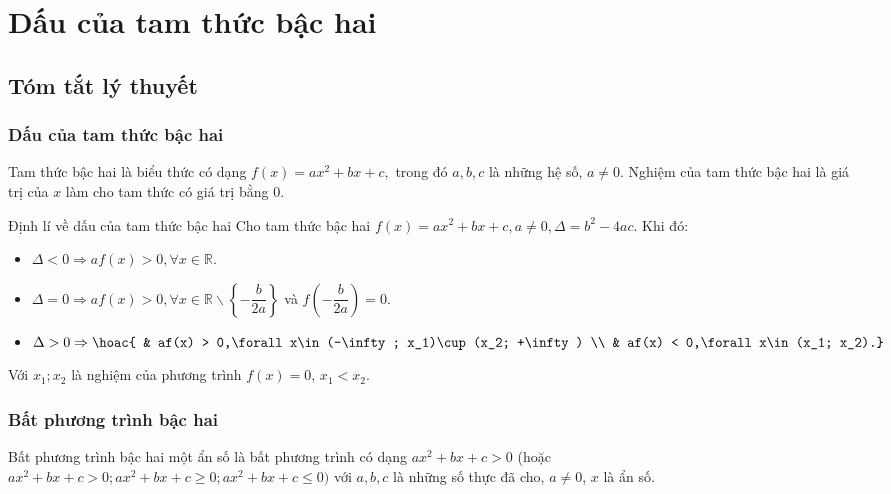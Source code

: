 \setcounter{dang}{0}
\section{Dấu của tam thức bậc hai}
\subsection{Tóm tắt lý thuyết}
	\subsubsection{Dấu của tam thức bậc hai}
	\begin{dn}{}
	Tam thức bậc hai là biểu thức có dạng $f(x) = ax^2 + bx + c,$ trong đó $a,b,c$ là những hệ số, $a\ne 0$. Nghiệm của tam thức bậc hai là giá trị của $x$ làm cho tam thức có giá trị bằng $0$.
	\end{dn}
	\begin{dl}{Định lí về dấu của tam thức bậc hai}
	Cho tam thức bậc hai $f(x) = ax^2 + bx + c,a\ne 0,\Delta = b^2 - 4ac$.
	Khi đó:
	\begin{itemize}
	\item $\Delta < 0\Rightarrow af(x) > 0,\forall x\in \mathbb{R}$.
	\item $ \Delta = 0\Rightarrow af(x) > 0,\forall x\in \mathbb{R}\backslash \left\{ - \dfrac{b}{2a}\right\} $ và $f\left(-\dfrac{b}{2a}\right)=0$.
	\item $ \Delta > 0\Rightarrow \hoac{
	& af(x) > 0,\forall x\in (-\infty; x_1)\cup (x_2; +\infty) \\ 
	& af(x) < 0,\forall x\in (x_1; x_2).}$
	\end{itemize}
	Với $x_1;x_2$ là nghiệm của phương trình $f(x) = 0$, $x_1 < x_2$.
	\end{dl}
	\subsubsection{Bất phương trình bậc hai}
	\begin{dn}{}
	Bất phương trình bậc hai một ẩn số là bất phương trình có dạng $ax^2 + bx + c > 0$ (hoặc $ax^2 + bx + c > 0; ax^2 + bx + c\ge 0; ax^2 + bx + c\le 0)$ với $a,b,c$ là những số thực đã cho, $a\ne 0$, $x$ là ẩn số.
	\end{dn}
